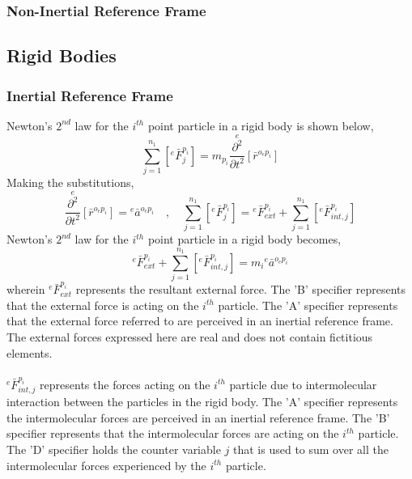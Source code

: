 \documentclass[a4paper, 12pt]{report}
\begin{document}
\begin{center}
\subsubsection{Non-Inertial Reference Frame}
\begin{comment}
\end{comment}
\subsection{Rigid Bodies}
\begin{comment}
\end{comment}
\subsubsection{Inertial Reference Frame}
\begin{comment}
\end{comment}
Newton's $2^{nd}$ law for the $i^{th}$ point particle in a rigid body is shown below,
$$\sum^{n_{1}}_{j = 1}\left[{}^{e}\bar{F}^{p_{i}}_{j}\right] = m_{p_{i}}\overset{e}{\frac{\partial^{2}}{\partial t^{2}}}[\bar{r}^{o_{e}p_{i}}]$$
Making the substitutions,
\begin{equation}\overset{e}{\frac{\partial^{2}}{\partial t^{2}}}[\bar{r}^{o_{e}p_{i}}] = {}^{e}\bar{a}^{o_{e}p_{i}}\quad,\quad \sum^{n_{1}}_{j = 1}\left[{}^{e}\bar{F}^{p_{i}}_{j}\right] = {}^{e}\bar{F}^{p_{i}}_{ext} + \sum^{n_{1}}_{j = 1}\left[{}^{e}\bar{F}^{p_{i}}_{int,j}\right]\label{rigid-forces}\end{equation}
Newton's $2^{nd}$ law for the $i^{th}$ point particle in a rigid body becomes,
$${}^{e}\bar{F}^{p_{i}}_{ext} + \sum^{n_{1}}_{j = 1}\left[{}^{e}\bar{F}^{p_{i}}_{int,j}\right] = m_{i}{}^{e}\bar{a}^{o_{e}p_{i}}$$
wherein ${}^{e}\bar{F}^{p_{i}}_{ext}$ represents the resultant external force. The 'B' specifier represents that the external force is acting on the $i^{th}$ particle. The 'A' specifier represents that the external force referred to are perceived in an inertial reference frame. The external forces expressed here are real and does not contain fictitious elements.
\\~\\${}^{e}\bar{F}^{p_{i}}_{int,j}$ represents the forces acting on the $i^{th}$ particle due to intermolecular interaction between the particles in the rigid body. The 'A' specifier represents the intermolecular forces are perceived in an inertial reference frame. The 'B' specifier represents that the intermolecular forces are acting on the $i^{th}$ particle. The 'D' specifier holds the counter variable $j$ that is used to sum over all the intermolecular forces experienced by the $i^{th}$ particle. 

\end{center}
\end{document}
